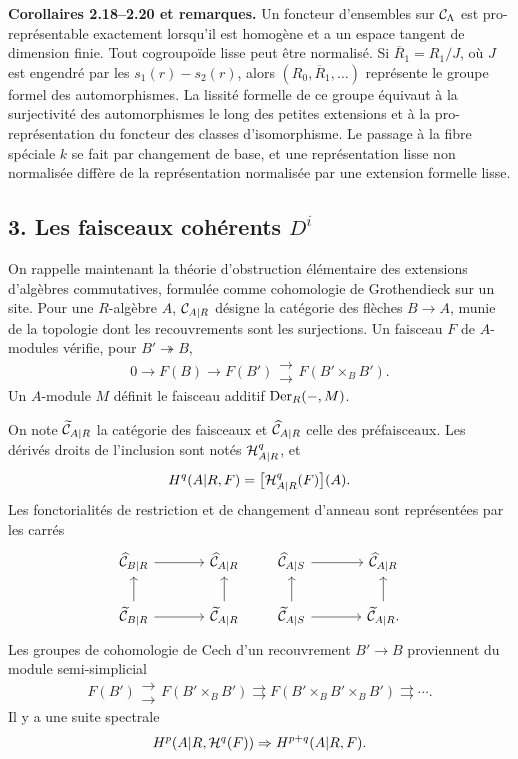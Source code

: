 \documentclass[11pt]{article}
\begin{document}
\textbf{Corollaires 2.18--2.20 et remarques.}  Un foncteur d'ensembles sur \(\mathcal C_\Lambda\) est pro-représentable exactement lorsqu'il est homogène et a un espace tangent de dimension finie.  Tout cogroupoïde lisse peut être normalisé.  Si \(\overline R_1=R_1/J\), où \(J\) est engendré par les \(s_1(r)-s_2(r)\), alors \((R_0,\overline R_1,\ldots)\) représente le groupe formel des automorphismes.  La lissité formelle de ce groupe équivaut à la surjectivité des automorphismes le long des petites extensions et à la pro-représentation du foncteur des classes d'isomorphisme.  Le passage à la fibre spéciale \(k\) se fait par changement de base, et une représentation lisse non normalisée diffère de la représentation normalisée par une extension formelle lisse.

\subsection*{3. Les faisceaux cohérents \(D^i\)}

On rappelle maintenant la théorie d'obstruction élémentaire des extensions d'algèbres commutatives, formulée comme cohomologie de Grothendieck sur un site.  Pour une \(R\)-algèbre \(A\), \(\mathcal C_{A|R}\) désigne la catégorie des flèches \(B\to A\), munie de la topologie dont les recouvrements sont les surjections.  Un faisceau \(F\) de \(A\)-modules vérifie, pour \(B'\twoheadrightarrow B\),
\[
0\to F(B)\to F(B')\mathrel{\substack{\longrightarrow\\[-.6ex]\longrightarrow}} F(B'\times_BB').
\]
Un \(A\)-module \(M\) définit le faisceau additif \(\operatorname{Der}_R(-,M)\).

On note \(\widetilde{\mathcal C}_{A|R}\) la catégorie des faisceaux et \(\widehat{\mathcal C}_{A|R}\) celle des préfaisceaux.  Les dérivés droits de l'inclusion sont notés \(\mathcal H^q_{A|R}\), et
\[
H^q(A|R,F)=\bigl[\mathcal H^q_{A|R}(F)\bigr](A).
\]
Les fonctorialités de restriction et de changement d'anneau sont représentées par les carrés
\[
\begin{tikzcd}[column sep=large]
\widehat{\cC}_{B|R} \arrow[r] & \widehat{\cC}_{A|R} \\
\widetilde{\cC}_{B|R} \arrow[u] \arrow[r] & \widetilde{\cC}_{A|R} \arrow[u]
\end{tikzcd}
\qquad
\begin{tikzcd}[column sep=large]
\widehat{\cC}_{A|S} \arrow[r] & \widehat{\cC}_{A|R} \\
\widetilde{\cC}_{A|S} \arrow[u] \arrow[r] & \widetilde{\cC}_{A|R} \arrow[u].
\end{tikzcd}
\]
Les groupes de cohomologie de Cech d'un recouvrement \(B'\to B\) proviennent du module semi-simplicial
\[
F(B')\mathrel{\substack{\longrightarrow\\[-.6ex]\longrightarrow}} F(B'\times_BB')\rightrightarrows F(B'\times_BB'\times_BB')\rightrightarrows\cdots .
\]
Il y a une suite spectrale
\[
H^p(A|R,\mathcal H^q(F))\Rightarrow H^{p+q}(A|R,F).
\]
\end{document}
